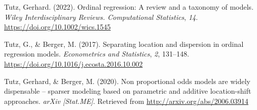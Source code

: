 \documentclass[
  man,floatsintext]{apa6}
\newlength{\cslhangindent}
\newenvironment{CSLReferences}[2] %
 {\begin{list}{}{%
  \setlength{\itemindent}{0pt}
  \setlength{\leftmargin}{0pt}
  \setlength{\parsep}{0pt}
  \ifodd #1
   \setlength{\leftmargin}{\cslhangindent}
   \setlength{\itemindent}{-1\cslhangindent}
  \fi
  \setlength{\itemsep}{#2\baselineskip}}}
 {\end{list}}
\begin{document}
\begin{CSLReferences}{1}{0}
Tutz, Gerhard. (2022). Ordinal regression: A review and a taxonomy of models. \emph{Wiley Interdisciplinary Reviews. Computational Statistics}, \emph{14}. \url{https://doi.org/10.1002/wics.1545}

Tutz, G., \& Berger, M. (2017). Separating location and dispersion in ordinal regression models. \emph{Econometrics and Statistics}, \emph{2}, 131--148. \url{https://doi.org/10.1016/j.ecosta.2016.10.002}

Tutz, Gerhard, \& Berger, M. (2020). Non proportional odds models are widely dispensable -- sparser modeling based on parametric and additive location-shift approaches. \emph{arXiv {[}Stat.ME{]}}. Retrieved from \url{http://arxiv.org/abs/2006.03914}

\end{CSLReferences}
\end{document}
